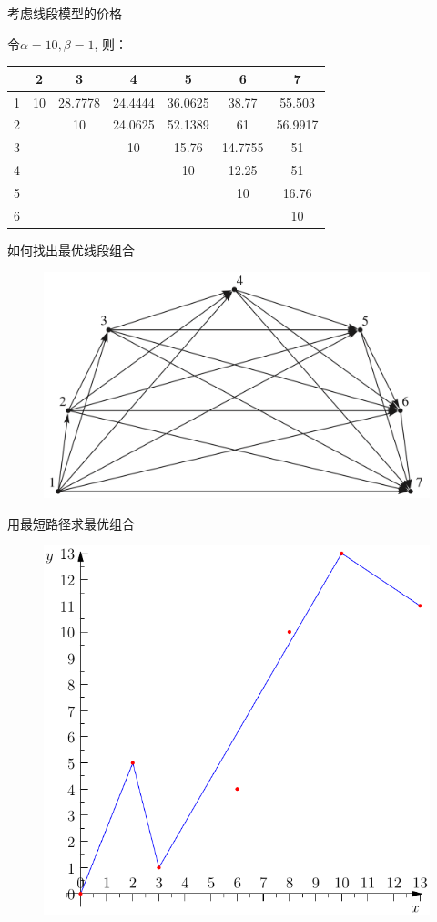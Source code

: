 \documentclass[UTF8]{ctexbeamer}
\begin{document}
\begin{frame}{考虑线段模型的价格}
  \begin{block}{}
    令$\alpha=10, \beta=1$, 则：
  \end{block}
  \begin{table}
    \centering
    \begin{tabular}{ccccccc}
      \hline
      & 2 & 3 & 4 & 5 & 6 & 7\\
      \hline
      1 & 10 & 28.7778 & 24.4444 & 36.0625 & 38.77  & 55.503 \\
      2 &  & 10 & 24.0625 & 52.1389 & 61 & 56.9917\\
      3 &  &  & 10 & 15.76 & 14.7755 & 51\\
      4 &  &  &  & 10 & 12.25 & 51\\
      5 &  &  &  & & 10 & 16.76\\
      6 &  &  &  & & & 10\\
      \hline
    \end{tabular}
  \end{table}
\end{frame}

\begin{frame}{如何找出最优线段组合}
  \begin{figure}
    \centering
    \includegraphics[width=.5\textwidth]{optimal.png}
  \end{figure}

\end{frame}

\begin{frame}{用最短路径求最优组合}
  \begin{figure}
    \centering
    \includegraphics[width=.5\textwidth]{optline.pdf}
  \end{figure}
\end{frame}
\end{document}
